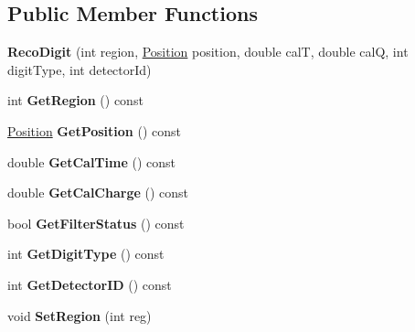 \subsection*{Public Member Functions}
\begin{DoxyCompactItemize}
\item 
\hypertarget{classRecoDigit_a101154b65ec76df7cc97c14f6d1dc6c6}{{\bfseries Reco\-Digit} (int region, \hyperlink{classPosition}{Position} position, double cal\-T, double cal\-Q, int digit\-Type, int detector\-Id)}\label{classRecoDigit_a101154b65ec76df7cc97c14f6d1dc6c6}

\item 
\hypertarget{classRecoDigit_a232afcbdf7e4d02806ad45c16d66f471}{int {\bfseries Get\-Region} () const }\label{classRecoDigit_a232afcbdf7e4d02806ad45c16d66f471}

\item 
\hypertarget{classRecoDigit_ac0b01228a2338ce349faf7f155a53409}{\hyperlink{classPosition}{Position} {\bfseries Get\-Position} () const }\label{classRecoDigit_ac0b01228a2338ce349faf7f155a53409}

\item 
\hypertarget{classRecoDigit_a0233d80913069093a4c280cd1bc9ffa6}{double {\bfseries Get\-Cal\-Time} () const }\label{classRecoDigit_a0233d80913069093a4c280cd1bc9ffa6}

\item 
\hypertarget{classRecoDigit_a5b6de9e5c454aba68e9adae03608b37d}{double {\bfseries Get\-Cal\-Charge} () const }\label{classRecoDigit_a5b6de9e5c454aba68e9adae03608b37d}

\item 
\hypertarget{classRecoDigit_a4afdb96357a5f77b51bc3505001406b1}{bool {\bfseries Get\-Filter\-Status} () const }\label{classRecoDigit_a4afdb96357a5f77b51bc3505001406b1}

\item 
\hypertarget{classRecoDigit_a2802e24aaeba074aefc4d8c61a779888}{int {\bfseries Get\-Digit\-Type} () const }\label{classRecoDigit_a2802e24aaeba074aefc4d8c61a779888}

\item 
\hypertarget{classRecoDigit_aa8f0ef1d80bdfa8cb97913d339b015be}{int {\bfseries Get\-Detector\-I\-D} () const }\label{classRecoDigit_aa8f0ef1d80bdfa8cb97913d339b015be}

\item 
\hypertarget{classRecoDigit_a9ca1c7f5a86fca02e7a95337f8f6e0a1}{void {\bfseries Set\-Region} (int reg)}\label{classRecoDigit_a9ca1c7f5a86fca02e7a95337f8f6e0a1}


\end{DoxyCompactItemize}

